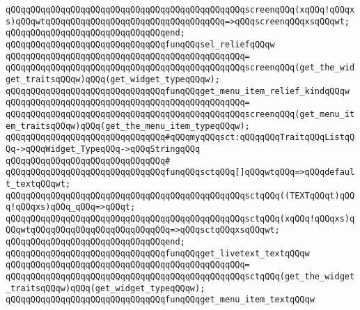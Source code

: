 \verb|qQQqqQQqqQQqqQQqqQQqqQQqqQQqqQQqqQQqqQQqqQQqqQQqscreenqQQq(xqQQq!qQQqxs)qQQqwtqQQqqQQqqQQqqQQqqQQqqQQqqQQqqQQqqQQq=>qQQqscreenqQQqxsqQQqwt;|\newline
\verb|qQQqqQQqqQQqqQQqqQQqqQQqqQQqqQQqend;|\newline
\newline
\verb|qQQqqQQqqQQqqQQqqQQqqQQqqQQqqQQqfunqQQqsel_reliefqQQqw|\newline
\verb|qQQqqQQqqQQqqQQqqQQqqQQqqQQqqQQqqQQqqQQqqQQqqQQq=|\newline
\verb|qQQqqQQqqQQqqQQqqQQqqQQqqQQqqQQqqQQqqQQqqQQqqQQqscreenqQQq(get_the_widget_traitsqQQqw)qQQq(get_widget_typeqQQqw);|\newline
\newline
\verb|qQQqqQQqqQQqqQQqqQQqqQQqqQQqqQQqfunqQQqget_menu_item_relief_kindqQQqw|\newline
\verb|qQQqqQQqqQQqqQQqqQQqqQQqqQQqqQQqqQQqqQQqqQQqqQQq=|\newline
\verb|qQQqqQQqqQQqqQQqqQQqqQQqqQQqqQQqqQQqqQQqqQQqqQQqscreenqQQq(get_menu_item_traitsqQQqw)qQQq(get_the_menu_item_typeqQQqw);|\newline
\newline
\verb|qQQqqQQqqQQqqQQqqQQqqQQqqQQqqQQq#qQQqmyqQQqsct:qQQqqQQqTraitqQQqListqQQq->qQQqWidget_TypeqQQq->qQQqStringqQQq|\newline
\verb|qQQqqQQqqQQqqQQqqQQqqQQqqQQqqQQq#|\newline
\verb|qQQqqQQqqQQqqQQqqQQqqQQqqQQqqQQqfunqQQqsctqQQq[]qQQqwtqQQq=>qQQqdefault_textqQQqwt;|\newline
\verb|qQQqqQQqqQQqqQQqqQQqqQQqqQQqqQQqqQQqqQQqqQQqqQQqsctqQQq((TEXTqQQqt)qQQq!qQQqxs)qQQq_qQQq=>qQQqt;|\newline
\verb|qQQqqQQqqQQqqQQqqQQqqQQqqQQqqQQqqQQqqQQqqQQqqQQqsctqQQq(xqQQq!qQQqxs)qQQqwtqQQqqQQqqQQqqQQqqQQqqQQqqQQq=>qQQqsctqQQqxsqQQqwt;|\newline
\verb|qQQqqQQqqQQqqQQqqQQqqQQqqQQqqQQqend;|\newline
\newline
\verb|qQQqqQQqqQQqqQQqqQQqqQQqqQQqqQQqfunqQQqget_livetext_textqQQqw|\newline
\verb|qQQqqQQqqQQqqQQqqQQqqQQqqQQqqQQqqQQqqQQqqQQqqQQq=|\newline
\verb|qQQqqQQqqQQqqQQqqQQqqQQqqQQqqQQqqQQqqQQqqQQqqQQqsctqQQq(get_the_widget_traitsqQQqw)qQQq(get_widget_typeqQQqw);|\newline
\newline
\verb|qQQqqQQqqQQqqQQqqQQqqQQqqQQqqQQqfunqQQqget_menu_item_textqQQqw|\newline
